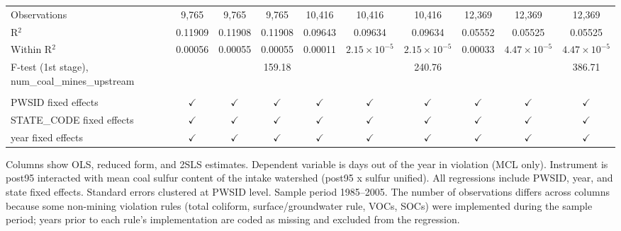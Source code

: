 \begin{table}[htbp]
\begin{adjustbox}{width = \textwidth, center}
\begin{tabular}{lccccccccc}
         Observations                                      & 9,765         & 9,765         & 9,765         & 10,416        & 10,416                & 10,416                & 12,369        & 12,369                & 12,369\\  
         R$^2$                                             & 0.11909       & 0.11908       & 0.11908       & 0.09643       & 0.09634               & 0.09634               & 0.05552       & 0.05525               & 0.05525\\  
         Within R$^2$                                      & 0.00056       & 0.00055       & 0.00055       & 0.00011       & $2.15\times 10^{-5}$  & $2.15\times 10^{-5}$  & 0.00033       & $4.47\times 10^{-5}$  & $4.47\times 10^{-5}$\\   
         F-test (1st stage), num\_coal\_mines\_upstream    &               &               & 159.18        &               &                       & 240.76                &               &                       & 386.71\\  
         
          \\
         
         PWSID fixed effects                               & $\checkmark$  & $\checkmark$  & $\checkmark$  & $\checkmark$  & $\checkmark$          & $\checkmark$          & $\checkmark$  & $\checkmark$          & $\checkmark$\\   
         STATE\_CODE fixed effects                         & $\checkmark$  & $\checkmark$  & $\checkmark$  & $\checkmark$  & $\checkmark$          & $\checkmark$          & $\checkmark$  & $\checkmark$          & $\checkmark$\\   
         year fixed effects                                & $\checkmark$  & $\checkmark$  & $\checkmark$  & $\checkmark$  & $\checkmark$          & $\checkmark$          & $\checkmark$  & $\checkmark$          & $\checkmark$\\   
         
         \bottomrule
         
      \end{tabular}
      
      
      
   \end{adjustbox}
      {\tiny\linespread{1}\selectfont \par \raggedright 
   Columns show OLS, reduced form, and 2SLS estimates. Dependent variable is days out of the year in violation (MCL only). Instrument is post95 interacted with mean coal sulfur content of the intake watershed (post95 x sulfur unified). All regressions include PWSID, year, and state fixed effects. Standard errors clustered at PWSID level. Sample period 1985--2005. The number of observations differs across columns because some non-mining violation rules (total coliform, surface/groundwater rule, VOCs, SOCs) were implemented during the sample period; years prior to each rule's implementation are coded as missing and excluded from the regression.}
   
\end{table}



